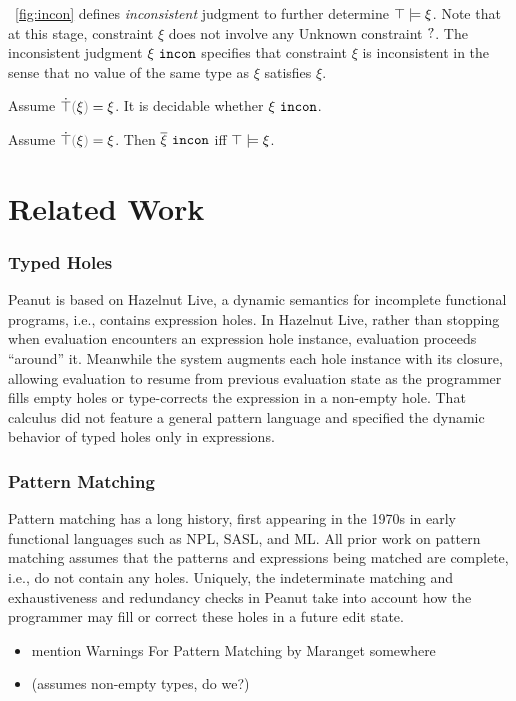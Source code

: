 \documentclass[runningheads,envcountsame,a4paper]{llncs}
\begin{document}
\figurename~\ref{fig:incon} defines \textit{inconsistent} judgment to further determine $\top \models \xi$. Note that at this stage, constraint $\xi$ does not involve any Unknown constraint $\mathtt{?}$. The inconsistent judgment $\xi ~\mathtt{incon}$ specifies that constraint $\xi$ is inconsistent in the sense that no value of the same type as $\xi$ satisfies $\xi$.



\begin{theorem}
  Assume $\ctruify{\xi}=\xi$. It is decidable whether $\xi ~\mathtt{incon}$.
\end{theorem}

\begin{theorem}
  Assume $\ctruify{\xi}=\xi$. Then $\overline{\xi} ~\mathtt{incon}$ iff $\top \models \xi$.
\end{theorem}

\section{Related Work}

\subsubsection{Typed Holes}
Peanut is based on Hazelnut Live, a dynamic semantics for incomplete functional programs, i.e., contains expression holes.
In Hazelnut Live, rather than stopping when evaluation encounters an
expression hole instance, evaluation proceeds ``around'' it.
Meanwhile the system augments each hole instance with its closure,
allowing evaluation to resume from previous evaluation state as
the programmer fills empty holes or type-corrects the expression
in a non-empty hole.
That calculus did not feature a general pattern language and specified
the dynamic behavior of typed holes only in expressions.

\subsubsection{Pattern Matching}
Pattern matching has a long history, first appearing in the 1970s in early functional languages
such as NPL, SASL, and ML.
All prior work on pattern matching assumes that the patterns and expressions being matched are
complete, i.e., do not contain any holes.
Uniquely, the indeterminate matching and exhaustiveness and redundancy checks in Peanut
take into account how the programmer may fill or correct these holes in a future edit state.
\begin{itemize}
    \item mention Warnings For Pattern Matching by Maranget somewhere
    \item (assumes non-empty types, do we?)
\end{itemize}
\end{document}
